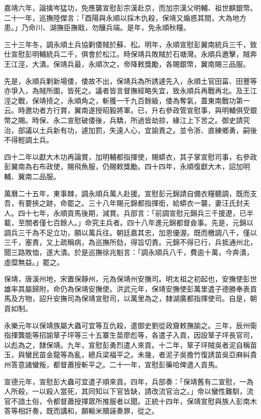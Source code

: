 \begin{pinyinscope}
嘉靖六年，論擒岑猛功，免應襲宣慰彭宗漢赴京，而加宗漢父明輔、祖世麒銀幣。二十一年，巡撫陸傑言：「酉陽與永順以採木仇殺，保靖又煽惑其間，大為地方患。」乃命川、湖撫臣撫戢，勿釀兵端。是年，免永順秋糧。

三十三年冬，調永順土兵協剿倭賊於蘇、松。明年，永順宣慰彭翼南統兵三千，致仕宣慰彭明輔統兵二千，俱會於松江。時保靖兵敗賊於石塘灣。永順兵邀擊，賊奔王江涇，大潰。保靖兵最，永順次之，帝降敕獎勵，各賜銀幣，翼南賜三品服。

先是，永順兵剿新場倭，倭故不出，保靖兵為所誘遽先入，永順土官田菑、田豐等亦爭入，為賊所圍，皆死之。議者皆言督撫經略失宜，致永順兵再戰再北。及王江涇之戰，保靖掎之，永順角之，斬獲一千九百餘級，倭為奪氣，蓋東南戰功第一云。時邀功者方行賞，翼南遂授昭毅將軍。已，升右參政管宣慰事，與明輔俱受銀幣之賜。時保、永二宣慰破倭後，兵驕，所過皆劫掠，緣江上下苦之。御史請究治，部議以土兵新有功，遽加罰，失遠人心，宜諭責之。並令浙、直練鄉勇，嗣後不得輕調土兵。

四十二年以獻大木功再論賞，加明輔都指揮使，賜蟒衣，其子掌宣慰司事，右參政彭翼南為右布政使，賜飛魚服，仍賜敕獎勵。四十四年，永順復獻大木，詔加明輔、翼南二品服。

萬曆二十五年，東事棘，調永順兵萬人赴援。宣慰彭元錦請自備衣糧聽調，既而支吾，有要挾之跡，命罷之。三十八年賜元錦都指揮銜，給蟒衣一襲，妻汪氏封夫人。四十七年，永順貢馬後期，減賞。兵部言：「前調宣慰元錦兵三千援遼，已半載，至關者僅七百餘人。」命究主兵者。四十八年進元錦都督僉事。先是，元錦以調兵三千為不足立功，願以萬兵往。朝廷嘉其忠，加恩優渥。既而檄調八千，僅以三千，塞責，又上疏稱病，為巡撫所劾，得旨切責。元錦不得已行，兵抵通州北，聞三路敗恤，遂大潰。於是巡撫徐兆魁言：「調永順兵八千，費逾十萬，今奔潰，虛糜無益。」罷之。

保靖，唐溪州地，宋置保靜州，元為保靖州安撫司。明太祖之初起也，安撫使彭世雄率其屬歸附，命仍為保靖安撫使。洪武元年，保靖安撫使彭萬里遣子德勝奉表貢馬及方物，詔升安撫司為保靖宣慰司，以萬里為之，隸湖廣都指揮使司。自是，朝貢如制。

永樂元年以保靖族屬大蟲可宜等互仇殺，遣御史劉從政齎敕撫諭之。三年，辰州衛指揮龔能等招諭筸子坪等三十五寨生苗廖彪等，各遣子入貢，因設筸子坪長官司，以彪為之，隸保靖。九年，宣慰彭勇烈遣人來貢。十二年，筸子坪賊吳者泥自稱苗玉，與蠻民苗金龍等為亂，總兵梁福平之。未幾，者泥子吳擔竹復誘苗吳亞麻糾貴州答意諸蠻叛，都督蕭授斬平之。二十一年，宣慰彭藥哈俾遣人貢馬。

宣德元年，宣慰彭大蟲可宜遣子順來貢。四年，兵部奏：「保靖舊有二宣慰，一為人所殺，一以殺人當死，其同知以下官皆缺，請改流官治之。」帝以蠻性難馴，流官不諳土俗，令都督蕭授擇眾所推服者以聞。正統十四年，保靖宣慰與族人彭南木答等相訐奏，既而講和，願輸米贖誣奏罪，從之。


\end{pinyinscope}
